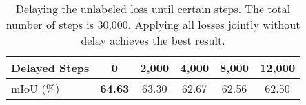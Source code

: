 \begin{table}[tb]
    \small
    \centering
    \caption{Delaying the unlabeled loss until certain steps. The total number of steps is 30,000. Applying all losses jointly without delay achieves the best result.}
    \label{tab:abl/delay}
\setlength{\tabcolsep}{6.5pt}
    \begin{tabular}{lccccc}
    \toprule
    Delayed Steps  & 0  & 2,000  & 4,000 & 8,000 & 12,000 \\
    \midrule
    mIoU (\%)   & \textbf{64.63}  & 63.30 & 62.67 & 62.56 & 62.50 \\
    \bottomrule
    \end{tabular}
    \vspace{-10pt}
\end{table}
